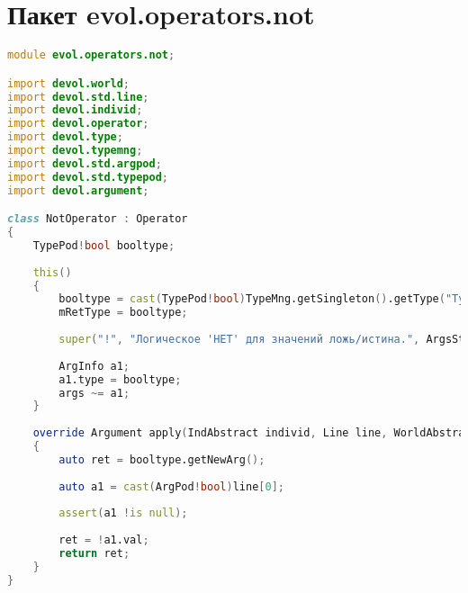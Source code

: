 \documentclass[russian,utf8,emptystyle]{eskdtext}
\begin{document}
\section{Пакет evol.operators.not}
\begin{lstlisting}[language=D]
module evol.operators.not;

import devol.world;
import devol.std.line;
import devol.individ;
import devol.operator;
import devol.type;
import devol.typemng;
import devol.std.argpod;
import devol.std.typepod;
import devol.argument;

class NotOperator : Operator
{
    TypePod!bool booltype;
    
    this()
    {
        booltype = cast(TypePod!bool)TypeMng.getSingleton().getType("Typebool");
        mRetType = booltype;
        
        super("!", "Логическое 'НЕТ' для значений ложь/истина.", ArgsStyle.UNAR_STYLE);
        
        ArgInfo a1;
        a1.type = booltype;
        args ~= a1;
    }
    
    override Argument apply(IndAbstract individ, Line line, WorldAbstract world)
    {
        auto ret = booltype.getNewArg();
        
        auto a1 = cast(ArgPod!bool)line[0];
        
        assert(a1 !is null);
        
        ret = !a1.val;
        return ret;
    }
}
\end{lstlisting}
\end{document}
